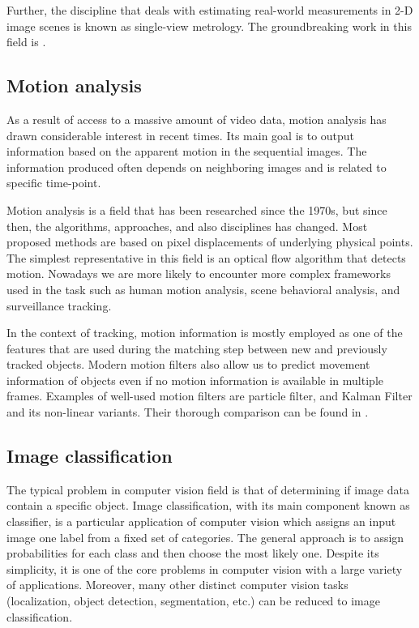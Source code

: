         Further, the discipline that deals with estimating real-world measurements in 2-D image scenes is known as single-view metrology. The groundbreaking work in this field is \cite{criminisi2002single}.
        
    \subsection{Motion analysis}
        As a result of access to a massive amount of video data, motion analysis has drawn considerable interest in recent times. Its main goal is to output information based on the apparent motion in the sequential images. The information produced often depends on neighboring images and is related to specific time-point. 

        Motion analysis is a field that has been researched since the 1970s, but since then, the algorithms, approaches, and also disciplines has changed. Most proposed methods are based on pixel displacements of underlying physical points. The simplest representative in this field is an optical flow algorithm that detects motion. Nowadays we are more likely to encounter more complex frameworks used in the task such as human motion analysis, scene behavioral analysis, and surveillance tracking.
        
        In the context of tracking, motion information is mostly employed as one of the features that are used during the matching step between new and previously tracked objects. Modern motion filters also allow us to predict movement information of objects even if no motion information is available in multiple frames. Examples of well-used motion filters are particle filter, and Kalman Filter and its non-linear variants. Their thorough comparison can be found in \cite{labbe2015kalman}.
  
    \subsection{Image classification}
        The typical problem in computer vision field is that of determining if image data contain a specific object. Image classification, with its main component known as classifier, is a particular application of computer vision which assigns an input image one label from a fixed set of categories. The general approach is to assign probabilities for each class and then choose the most likely one. Despite its simplicity, it is one of the core problems in computer vision with a large variety of applications. Moreover, many other distinct computer vision tasks (localization, object detection, segmentation, etc.) can be reduced to image classification.
        
